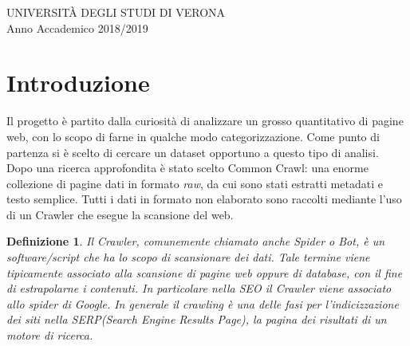 \documentclass{article}
\title{Analisi della lingua su un dataset\\
            di pagine web tramite \MR \\ \vskip 5px
            \Large- Progetto Finale Big Data -}
\author{\\Crosara Marco VR434403}
\date{Marzo 2019 / Aprile 2019}
\newcommand{\CC}{Common Crawl}
\newtheorem*{definition}{Definizione}
\begin{document}
\maketitle
\thispagestyle{empty}

\vspace{\fill}

\begin{center}
  UNIVERSITÀ DEGLI STUDI DI VERONA\\
Anno Accademico 2018/2019
\end{center}

\newpage

\tableofcontents
\thispagestyle{empty}

\newpage



\section{Introduzione}

Il progetto è partito dalla curiosità di analizzare un grosso quantitativo di pagine web, con lo scopo di farne in qualche modo categorizzazione. Come punto di partenza si è scelto di cercare un dataset opportuno a questo tipo di analisi. Dopo una ricerca approfondita è stato scelto \CC{}\cite{commoncrawl}: una enorme collezione di pagine dati in formato \textit{raw}, da cui sono stati estratti metadati e testo semplice. Tutti i dati in formato non elaborato sono raccolti mediante l'uso di un Crawler che esegue la scansione del web.

\begin{definition}
Il Crawler, comunemente chiamato anche Spider o Bot, è un software/script che ha lo scopo di scansionare dei dati. Tale termine viene tipicamente associato alla scansione di pagine web oppure di database, con il fine di estrapolarne i contenuti. In particolare nella SEO il Crawler viene associato allo spider di Google. In generale il crawling è una delle fasi per l’indicizzazione dei siti nella SERP(Search Engine Results Page), la pagina dei risultati di un motore di ricerca.
\end{definition}
\end{document}
